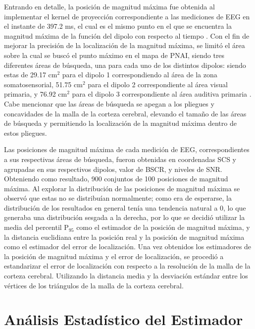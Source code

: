 Entrando en detalle, la posición de magnitud máxima fue obtenida al implementar el kernel de proyección correspondiente a las mediciones de EEG en el instante de 397.2 ms, el cual es el mismo punto en el que se encuentra la magnitud máxima de la función del dipolo con respecto al tiempo .
Con el fin de mejorar la precisión de la localización de la magnitud máxima, se limitó el área sobre la cual se buscó el punto máximo en el mapa de PNAI, siendo tres diferentes áreas de búsqueda, una para cada uno de los distintos dipolos: siendo estas de 29.17 cm$^2$ para el dipolo 1 correspondiendo al área de la zona somatosensorial, 51.75 cm$^2$ para el dipolo 2 correspondiente al área visual primaria, y 76.92 cm$^2$ para el dipolo 3 correspondiente al área auditiva primaria .
Cabe mencionar que las áreas de búsqueda se apegan a los pliegues y concavidades de la malla de la corteza cerebral, elevando el tamaño de las áreas de búsqueda y permitiendo la localización de la magnitud máxima dentro de estos pliegues.

Las posiciones de magnitud máxima de cada medición de EEG, correspondientes a sus respectivas áreas de búsqueda, fueron obtenidas en coordenadas SCS y agrupadas en sus respectivos dipolos, valor de BSCR, y niveles de SNR.
Obteniendo como resultado, 900 conjuntos de 100 posiciones de magnitud máxima. Al explorar la distribución de las posiciones de magnitud máxima se observó que estas no se distribuían normalmente; como era de esperarse, la distribución de los resultados en general tenía una tendencia natural a 0, lo que generaba una distribución sesgada a la derecha, por lo que se decidió utilizar la media del percentil P$_{95}$ como el estimador de la posición de magnitud máxima, y la distancia euclidiana entre la posición real y la posición de magnitud máxima como el estimador del error de localización.
Una vez obtenidos los estimadores de la posición de magnitud máxima y el error de localización, se procedió a estandarizar el error de localización con respecto a la resolución de la malla de la corteza cerebral. Utilizando la distancia media y la desviación estándar entre los vértices de los triángulos de la malla de la corteza cerebral.

\section{Análisis Estadístico del Estimador}
\label{sec:methodology:statistical}

